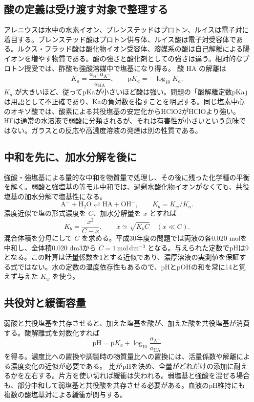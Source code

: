 \subsection{酸の定義は受け渡す対象で整理する}
\label{theory:chem_eq:definitions}
アレニウスは水中の水素イオン、ブレンステッドはプロトン、ルイスは電子対に着目する。ブレンステッド酸はプロトン供与体、ルイス酸は電子対受容体である。ルクス・フラッド酸は酸化物イオン受容体、溶媒系の酸は自己解離による陽イオンを増やす物質である。酸の強さと酸化剤としての強さは違う。相対的なプロトン授受では、酢酸も強酸溶媒中で塩基になり得る。
\label{theory:chem_eq:acid_strength}
酸 \(\mathrm{HA}\) の解離は
\[
K_a=\frac{a_{\mathrm{H^+}}a_{\mathrm{A^-}}}{a_{\mathrm{HA}}},
\qquad \mathrm{p}K_a=-\log_{10}K_a.
\]
\(K_a\) が大きいほど、従ってpKaが小さいほど酸は強い。問題の「酸解離定数pKa」は用語として不正確であり、Kaの負対数を指すことを明記する。同じ塩素中心のオキソ酸では、酸素による共役塩基の安定化からHClO2がHClOより強い。\cite{purdue_acid_strength}
HFは通常の水溶液で弱酸に分類されるが、それは有害性が小さいという意味ではない。ガラスとの反応や高濃度溶液の発煙は別の性質である。\cite{niosh_hf}

\subsection{中和を先に、加水分解を後に}
\label{theory:chem_eq:hydrolysis}
強酸・強塩基による量的な中和を物質量で処理し、その後に残った化学種の平衡を解く。弱酸と強塩基の等モル中和では、過剰水酸化物イオンがなくても、共役塩基の加水分解で塩基性になる。
\[
\mathrm{A^-+H_2O\rightleftharpoons HA+OH^-},\qquad K_b=K_w/K_a.
\]
濃度近似で塩の形式濃度を \(C\)、加水分解量を \(x\) とすれば
\[
K_b=\frac{x^2}{C-x},\qquad x\simeq\sqrt{K_bC}\quad(x\ll C).
\]
混合体積を分母にして \(C\) を求める。平成30年度の問題では両液の各0.020 molを中和し、全体積0.020 dm3から \(C=1\,\mathrm{mol\,dm^{-3}}\) となる。与えられた定数でpHは9となる。この計算は活量係数を1とする近似であり、濃厚溶液の実測値を保証する式ではない。水の定数の温度依存性もあるので、pHとpOHの和を常に14と覚えず与えた \(K_w\) を使う。

\subsection{共役対と緩衝容量}
\label{theory:chem_eq:buffer}
弱酸と共役塩基を共存させると、加えた塩基を酸が、加えた酸を共役塩基が消費する。酸解離式を対数化すれば
\[
\mathrm{pH=p}K_a+\log_{10}\frac{a_{\mathrm{A^-}}}{a_{\mathrm{HA}}}
\]
を得る。濃度比への置換や調製時の物質量比への置換には、活量係数や解離による濃度変化の近似が必要である。
比がpHを決め、全量がどれだけの添加に耐えるかを左右する。片方を使い切れば緩衝は失われる。弱塩基と強酸を混ぜる場合も、部分中和して弱塩基と共役酸を共存させる必要がある。血液のpH維持にも複数の酸塩基対による緩衝が関与する。\cite{mit_buffer2008}

